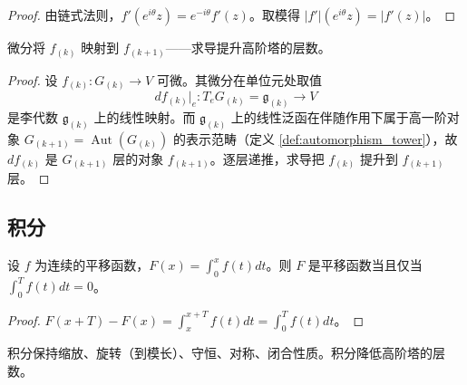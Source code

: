 \begin{proof}
由链式法则，$f'(e^{i\theta}z) = e^{-i\theta} f'(z)$。取模得 $|f'|(e^{i\theta}z) = |f'(z)|$。
\end{proof}

\begin{proposition}[微分下高阶性质的提升]\label{prop:diff_higher}
微分将 $f_{(k)}$ 映射到 $f_{(k+1)}$——求导提升高阶塔的层数。
\end{proposition}

\begin{proof}
设 $f_{(k)}:G_{(k)}\to V$ 可微。其微分在单位元处取值
\[
df_{(k)}\big|_e:T_eG_{(k)}=\mathfrak{g}_{(k)}\longrightarrow V
\]
是李代数 $\mathfrak{g}_{(k)}$ 上的线性映射。而 $\mathfrak{g}_{(k)}$ 上的线性泛函在伴随作用下属于高一阶对象 $G_{(k+1)}=\operatorname{Aut}(G_{(k)})$ 的表示范畴（定义 \ref{def:automorphism_tower}），故 $df_{(k)}$ 是 $G_{(k+1)}$ 层的对象 $f_{(k+1)}$。逐层递推，求导把 $f_{(k)}$ 提升到 $f_{(k+1)}$ 层。
\end{proof}

\subsection{积分}

\begin{proposition}[积分下平移性质的条件保持]\label{prop:int_translation}
设 $f$ 为连续的平移函数，$F(x) = \int_0^x f(t) dt$。则 $F$ 是平移函数当且仅当 $\int_0^T f(t) dt = 0$。
\end{proposition}

\begin{proof}
$F(x+T) - F(x) = \int_x^{x+T} f(t) dt = \int_0^T f(t) dt$。
\end{proof}

\begin{proposition}\label{prop:int_all}
积分保持缩放、旋转（到模长）、守恒、对称、闭合性质。积分降低高阶塔的层数。
\end{proposition}

